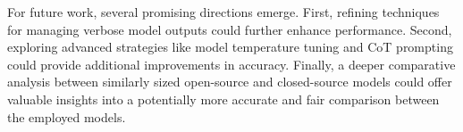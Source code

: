 For future work, several promising directions emerge. First, refining techniques for managing verbose model outputs could further enhance performance. Second, exploring advanced strategies like model temperature tuning and \ac{CoT} prompting could provide additional improvements in accuracy. Finally, a deeper comparative analysis between similarly sized open-source and closed-source models could offer valuable insights into a potentially more accurate and fair comparison between the employed models.
